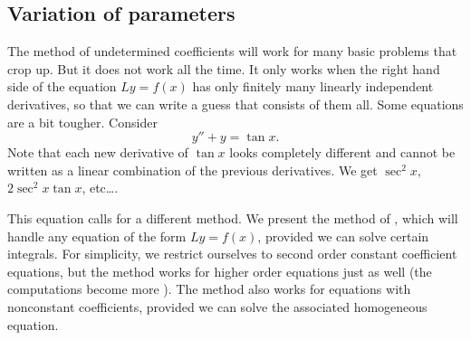 \subsection{Variation of parameters}

The method of undetermined coefficients will work for many basic
problems that crop up.  But it does not work all the time.  It only works
when the right hand side of the equation $Ly = f(x)$ has only finitely many
linearly independent derivatives, so that we can write a guess that consists
of them all.  Some equations are a bit tougher.  Consider
\begin{equation*}
y''+y = \tan x .
\end{equation*}
Note that each new derivative of $\tan x$ looks completely different and
cannot be written as a linear combination of the previous derivatives.
We get $\sec^2 x$, $2\sec^2 x \tan x$, etc\ldots.

This equation calls for a different method.  We present the method of
\emph{}, which will handle any equation of
the form $Ly = f(x)$,
provided we can solve certain integrals.  For simplicity, we restrict
ourselves to second order constant coefficient equations,
but the method works for higher
order equations just as well (the computations become more
). %
The method also works for equations with nonconstant coefficients,
provided we can solve the associated homogeneous equation.

